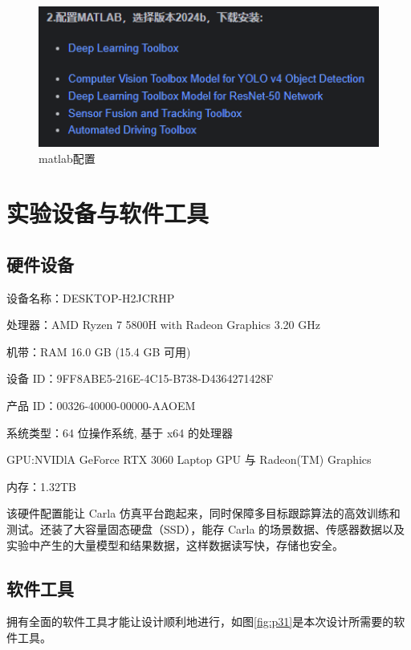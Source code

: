 \begin{figure}[htbp] %
	\centering
	\includegraphics[width=1\textwidth]{p8} %
	\caption{matlab配置} %
	\label{fig:p8} %
\end{figure}






\section{实验设备与软件工具}

\subsection{硬件设备}

设备名称：DESKTOP-H2JCRHP

处理器：AMD Ryzen 7 5800H with Radeon Graphics            3.20 GHz

机带：RAM	16.0 GB (15.4 GB 可用)

设备 ID：9FF8ABE5-216E-4C15-B738-D4364271428F

产品 ID：00326-40000-00000-AAOEM

系统类型：64 位操作系统, 基于 x64 的处理器

GPU:NVIDlA GeForce RTX 3060 Laptop GPU 与 Radeon(TM) Graphics

内存：1.32TB

该硬件配置能让 Carla 仿真平台跑起来，同时保障多目标跟踪算法的高效训练和测试。还装了大容量固态硬盘（SSD），能存 Carla 的场景数据、传感器数据以及实验中产生的大量模型和结果数据，这样数据读写快，存储也安全。


\subsection{软件工具}

拥有全面的软件工具才能让设计顺利地进行，如图\ref{fig:p31}是本次设计所需要的软件工具。

